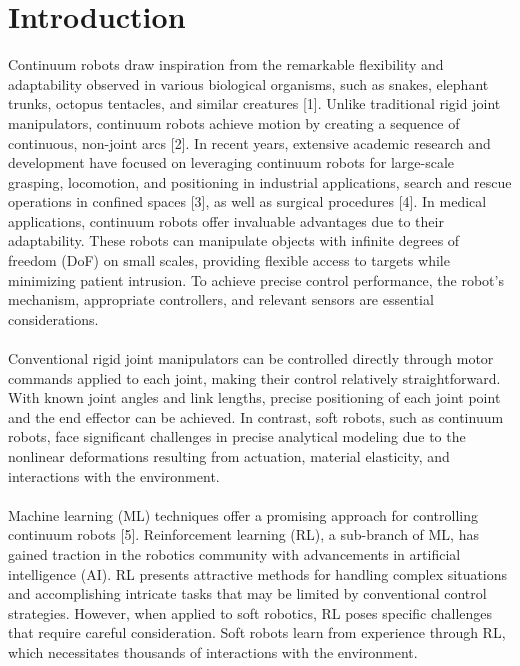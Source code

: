 \documentclass[12pt,twoside,a4]{mwbk}
\begin{document}
\chapter{Introduction}
Continuum robots draw inspiration from the remarkable flexibility and adaptability observed in various biological organisms, such as snakes, elephant trunks, octopus tentacles, and similar creatures [1]. Unlike traditional rigid joint manipulators, continuum robots achieve motion by creating a sequence of continuous, non-joint arcs [2]. In recent years, extensive academic research and development have focused on leveraging continuum robots for large-scale grasping, locomotion, and positioning in industrial applications, search and rescue operations in confined spaces [3], as well as surgical procedures [4]. In medical applications, continuum robots offer invaluable advantages due to their adaptability. These robots can manipulate objects with infinite degrees of freedom (DoF) on small scales, providing flexible access to targets while minimizing patient intrusion. To achieve precise control performance, the robot's mechanism, appropriate controllers, and relevant sensors are essential considerations.
\\ \\
Conventional rigid joint manipulators can be controlled directly through motor commands applied to each joint, making their control relatively straightforward. With known joint angles and link lengths, precise positioning of each joint point and the end effector can be achieved. In contrast, soft robots, such as continuum robots, face significant challenges in precise analytical modeling due to the nonlinear deformations resulting from actuation, material elasticity, and interactions with the environment.
\\ \\
Machine learning (ML) techniques offer a promising approach for controlling continuum robots [5]. Reinforcement learning (RL), a sub-branch of ML, has gained traction in the robotics community with advancements in artificial intelligence (AI). RL presents attractive methods for handling complex situations and accomplishing intricate tasks that may be limited by conventional control strategies. However, when applied to soft robotics, RL poses specific challenges that require careful consideration. Soft robots learn from experience through RL, which necessitates thousands of interactions with the environment. 
\end{document}
